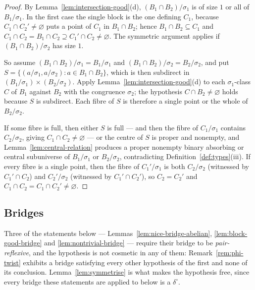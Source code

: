 \begin{proof}
By Lemma~\ref{lem:intersection-good}(d), $(B_{1}\cap B_{2})/\sigma_{1}$ is of
size $1$ or all of $B_{1}/\sigma_{1}$. In the first case the single block is
the one defining $C_{1}$, because $C_{1}\cap C_{2}'\neq\varnothing$ puts a
point of $C_{1}$ in $B_{1}\cap B_{2}$; hence $B_{1}\cap B_{2}\subseteq C_{1}$
and $C_{1}\cap C_{2}=B_{1}\cap C_{2}\supseteq C_{1}'\cap C_{2}\neq\varnothing$.
The symmetric argument applies if $(B_{1}\cap B_{2})/\sigma_{2}$ has size $1$.

So assume $(B_{1}\cap B_{2})/\sigma_{1}=B_{1}/\sigma_{1}$ and
$(B_{1}\cap B_{2})/\sigma_{2}=B_{2}/\sigma_{2}$, and put
$S=\{(a/\sigma_{1},a/\sigma_{2}):a\in B_{1}\cap B_{2}\}$, which is then
subdirect in $(B_{1}/\sigma_{1})\times(B_{2}/\sigma_{2})$. Apply
Lemma~\ref{lem:intersection-good}(d) to each $\sigma_{1}$-class $C$ of $B_{1}$
against $B_{2}$ with the congruence $\sigma_{2}$; the hypothesis
$C\cap B_{2}\neq\varnothing$ holds because $S$ is subdirect. Each fibre of $S$
is therefore a single point or the whole of $B_{2}/\sigma_{2}$.

If some fibre is full, then either $S$ is full --- and then the fibre of
$C_{1}/\sigma_{1}$ contains $C_{2}/\sigma_{2}$, giving $C_{1}\cap C_{2}\neq
\varnothing$ --- or the centre of $S$ is proper and nonempty, and
Lemma~\ref{lem:central-relation} produces a proper nonempty binary absorbing or
central subuniverse of $B_{1}/\sigma_{1}$ or $B_{2}/\sigma_{2}$, contradicting
Definition~\ref{def:types}(iii). If every fibre is a single point, then the
fibre of $C_{1}'/\sigma_{1}$ is both $C_{2}/\sigma_{2}$ (witnessed by
$C_{1}'\cap C_{2}$) and $C_{2}'/\sigma_{2}$ (witnessed by $C_{1}'\cap C_{2}'$),
so $C_{2}=C_{2}'$ and $C_{1}\cap C_{2}=C_{1}\cap C_{2}'\neq\varnothing$.
\end{proof}

\subsection{Bridges}\label{sec:bridge-proofs}

Three of the statements below --- Lemmas~\ref{lem:nice-bridge-abelian},
\ref{lem:block-good-bridge} and \ref{lem:nontrivial-bridge} --- require their
bridge to be \emph{pair-reflexive}, and the hypothesis is not cosmetic in any
of them: Remark~\ref{rem:phi-twist} exhibits a bridge satisfying every other
hypothesis of the first and none of its conclusion. Lemma~\ref{lem:symmetrise}
is what makes the hypothesis free, since every bridge these statements are
applied to below is a $\delta^{\circ}$.

